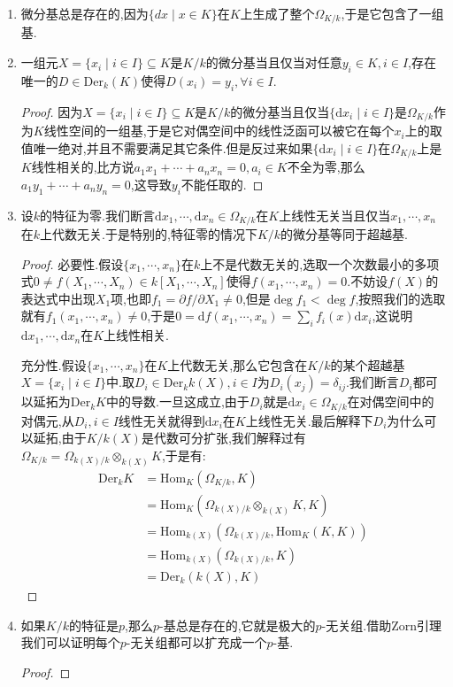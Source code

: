 \begin{enumerate}
	\item 微分基总是存在的,因为$\{dx\mid x\in K\}$在$K$上生成了整个$\Omega_{K/k}$,于是它包含了一组基.
	\item 一组元$X=\{x_i\mid i\in I\}\subseteq K$是$K/k$的微分基当且仅当对任意$y_i\in K,i\in I$,存在唯一的$D\in\mathrm{Der}_k(K)$使得$D(x_i)=y_i,\forall i\in I$.
	\begin{proof}
		
		因为$X=\{x_i\mid i\in I\}\subseteq K$是$K/k$的微分基当且仅当$\{\mathrm{d}x_i\mid i\in I\}$是$\Omega_{K/k}$作为$K$线性空间的一组基,于是它对偶空间中的线性泛函可以被它在每个$x_i$上的取值唯一绝对,并且不需要满足其它条件.但是反过来如果$\{\mathrm{d}x_i\mid i\in I\}$在$\Omega_{K/k}$上是$K$线性相关的,比方说$a_1x_1+\cdots+a_nx_n=0,a_i\in K$不全为零,那么$a_1y_1+\cdots+a_ny_n=0$,这导致$y_i$不能任取的.
	\end{proof}
	\item 设$k$的特征为零.我们断言$\mathrm{d}x_1,\cdots,\mathrm{d}x_n\in\Omega_{K/k}$在$K$上线性无关当且仅当$x_1,\cdots,x_n$在$k$上代数无关.于是特别的,特征零的情况下$K/k$的微分基等同于超越基.
	\begin{proof}
		
		必要性.假设$\{x_1,\cdots,x_n\}$在$k$上不是代数无关的,选取一个次数最小的多项式$0\not=f(X_1,\cdots,X_n)\in k[X_1,\cdots,X_n]$使得$f(x_1,\cdots,x_n)=0$.不妨设$f(X)$的表达式中出现$X_1$项,也即$f_1=\partial f/\partial X_1\not=0$,但是$\deg f_1<\deg f$,按照我们的选取就有$f_1(x_1,\cdots,x_n)\not=0$,于是$0=\mathrm{d}f(x_1,\cdots,x_n)=\sum_if_i(x)\mathrm{d}x_i$,这说明$\mathrm{d}x_1,\cdots,\mathrm{d}x_n$在$K$上线性相关.
		
		\qquad
		
		充分性.假设$\{x_1,\cdots,x_n\}$在$K$上代数无关,那么它包含在$K/k$的某个超越基$X=\{x_i\mid i\in I\}$中.取$D_i\in\mathrm{Der}_kk(X),i\in I$为$D_i(x_j)=\delta_{ij}$.我们断言$D_i$都可以延拓为$\mathrm{Der}_kK$中的导数.一旦这成立,由于$D_i$就是$\mathrm{d}x_i\in\Omega_{K/k}$在对偶空间中的对偶元,从$D_i,i\in I$线性无关就得到$\mathrm{d}x_i$在$K$上线性无关.最后解释下$D_i$为什么可以延拓,由于$K/k(X)$是代数可分扩张,我们解释过有$\Omega_{K/k}=\Omega_{k(X)/k}\otimes_{k(X)}K$,于是有:
		\begin{align*}
			\mathrm{Der}_kK&=\mathrm{Hom}_K(\Omega_{K/k},K)\\&=\mathrm{Hom}_K(\Omega_{k(X)/k}\otimes_{k(X)}K,K)\\&=\mathrm{Hom}_{k(X)}(\Omega_{k(X)/k},\mathrm{Hom}_K(K,K))\\&=\mathrm{Hom}_{k(X)}(\Omega_{k(X)/k},K)\\&=\mathrm{Der}_k(k(X),K)
		\end{align*}
	\end{proof}
    \item 如果$K/k$的特征是$p$,那么$p$-基总是存在的,它就是极大的$p$-无关组.借助Zorn引理我们可以证明每个$p$-无关组都可以扩充成一个$p$-基.
    \begin{proof}
    	

\end{proof}
\end{enumerate}
